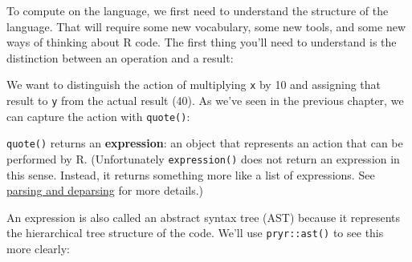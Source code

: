 
To compute on the language, we first need to understand the structure of
the language. That will require some new vocabulary, some new tools, and
some new ways of thinking about R code. The first thing you'll need to
understand is the distinction between an operation and a result:

\begin{Shaded}
\begin{Highlighting}[]
\StringTok{ }
\StringTok{ }\StringTok{ }
\end{Highlighting}
\end{Shaded}

We want to distinguish the action of multiplying \texttt{x} by 10 and
assigning that result to \texttt{y} from the actual result (40). As
we've seen in the previous chapter, we can capture the action with
\texttt{quote()}:

\begin{Shaded}
\begin{Highlighting}[]
\StringTok{ }\StringTok{ }\StringTok{ }\NormalTok{)}
\end{Highlighting}
\end{Shaded}

\texttt{quote()} returns an \textbf{expression}: an object that
represents an action that can be performed by R. (Unfortunately
\texttt{expression()} does not return an expression in this sense.
Instead, it returns something more like a list of expressions. See
\hyperref[parsing-and-deparsing]{parsing and deparsing} for more
details.) 

An expression is also called an abstract syntax tree (AST) because it
represents the hierarchical tree structure of the code. We'll use
\texttt{pryr::ast()} to see this more clearly:
 

\begin{Shaded}
\begin{Highlighting}[]
\StringTok{ }\StringTok{ }\NormalTok{)}
\CommentTok{#> \textbackslash{}- ()}
\CommentTok{#>   \textbackslash{}- ()}
\end{Highlighting}
\end{Shaded}

